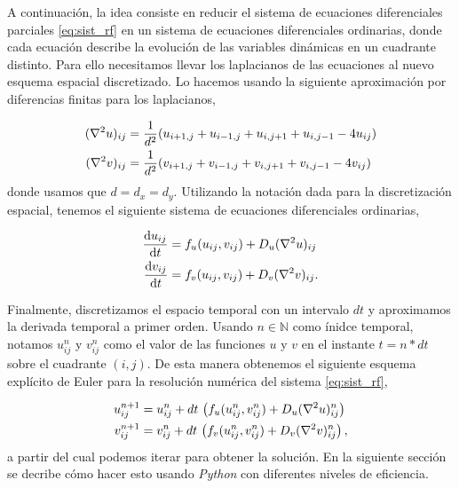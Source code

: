 A continuación, la idea consiste en reducir el sistema de ecuaciones diferenciales parciales \ref{eq:sist_rf} en un sistema de ecuaciones diferenciales ordinarias, donde 
cada ecuación describe la evolución de las variables dinámicas en un cuadrante distinto. Para ello necesitamos llevar los laplacianos de las ecuaciones al nuevo esquema 
espacial discretizado. Lo hacemos usando la siguiente aproximación por diferencias finitas para los laplacianos,

\begin{equation}
  \begin{split}
    (\laplacian u)_{ij} &= \frac{1}{d^2}(u_{i+1,j}+u_{i-1,j}+u_{i,j+1}+u_{i,j-1}-4u_{ij})\\
    (\laplacian v)_{ij} &= \frac{1}{d^2}(v_{i+1,j}+v_{i-1,j}+v_{i,j+1}+v_{i,j-1}-4v_{ij})
    \label{eq:lap}
  \end{split}
\end{equation}
donde usamos que $d = d_x = d_y$.  Utilizando la notación dada para la discretización espacial, tenemos el siguiente sistema 
de ecuaciones diferenciales ordinarias,

\begin{equation}
  \begin{split}
  \dv{u_{ij}}{t} & = f_u(u_{ij},v_{ij}) + D_u (\laplacian u)_{ij} \\
  \dv{v_{ij}}{t} & = f_v(u_{ij},v_{ij}) + D_v (\laplacian v)_{ij}.
  \label{eq:sist_ord}
  \end{split}
\end{equation}

Finalmente, discretizamos el espacio temporal con un intervalo $dt$ y aproximamos la derivada temporal a primer orden. Usando $n\in \mathbb{N}$ como ínidce temporal, notamos $u_{ij}^n$ 
y $v_{ij}^n$ como el valor de las funciones $u$ y $v$ en el instante $t = n*dt$ sobre el cuadrante $(i,j)$. De esta manera obtenemos el siguiente 
esquema explícito de Euler para la resolución numérica del sistema \ref{eq:sist_rf},

\begin{equation}
  \begin{split}
    u_{ij}^{n+1} & = u_{ij}^n + dt \, \left(f_u(u_{ij}^n,v_{ij}^n) + D_u (\laplacian u)_{ij}^n\right) \\
    v_{ij}^{n+1} & = v_{ij}^n + dt \, \left(f_v(u_{ij}^n,v_{ij}^n) + D_v (\laplacian v)_{ij}^n\right),  
    \label{eq:euler}
  \end{split}
\end{equation}
a partir del cual podemos iterar para obtener la solución. En la siguiente sección se decribe cómo hacer esto usando \textit{Python} con diferentes niveles de eficiencia.


